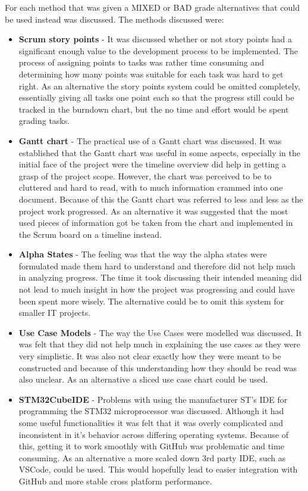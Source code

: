 For each method that was given a MIXED or BAD grade alternatives that could be used instead was discussed. The methods discussed were:
\begin{itemize}
    \item \textbf{Scrum story points} - It was discussed whether or not story points had a significant enough value to the development process to be implemented. The process of assigning points to tasks was rather time consuming and determining how many points was suitable for each task was hard to get right. As an alternative the story points system could be omitted completely, essentially giving all tasks one point each so that the progress still could be tracked in the burndown chart, but the no time and effort would be spent grading tasks.
    \item \textbf{Gantt chart} - The practical use of a Gantt chart was discussed. It was established that the Gantt chart was useful in some aspects, especially in the initial face of the project were the timeline overview did help in getting a grasp of the project scope. However, the chart was perceived to be to cluttered and hard to read, with to much information crammed into one document. Because of this the Gantt chart was referred to less and less as the project work progressed. As an alternative it was suggested that the most used pieces of information got be taken from the chart and implemented in the Scrum board on a timeline instead.
    \item \textbf{Alpha States} - The feeling was that the way the alpha states were formulated made them hard to understand and therefore did not help much in analyzing progress. The time it took discussing their intended meaning did not lead to much insight in how the project was progressing and could have been spent more wisely. The alternative could be to omit this system for smaller IT projects.
    \item \textbf{Use Case Models} - The way the Use Cases were modelled was discussed. It was felt that they did not help much in explaining the use cases as they were very simplistic. It was also not clear exactly how they were meant to be constructed and because of this understanding how they should be read was also unclear. As an alternative a sliced use case chart could be used.
    \item \textbf{STM32CubeIDE} - Problems with using the manufacturer ST's IDE for programming the STM32 microprocessor was discussed. Although it had some useful functionalities it was felt that it was overly complicated and inconsistent in it's behavior across differing operating systems. Because of this, getting it to work smoothly with GitHub was problematic and time consuming. As an alternative a more scaled down 3rd party IDE, such as VSCode, could be used. This would hopefully lead to easier integration with GitHub and more stable cross platform performance.
\end{itemize}
